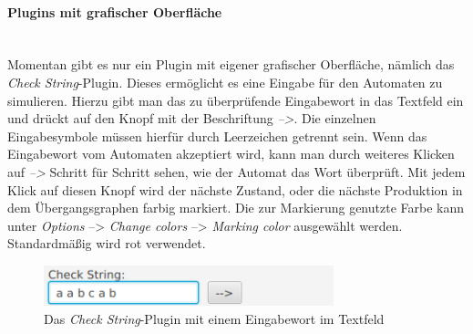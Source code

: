 \paragraph{Plugins mit grafischer Oberfläche}\ \\
\label{sec:2.4.2.1}
Momentan gibt es nur ein Plugin mit eigener grafischer Oberfläche, nämlich das \textit{Check String}-Plugin. Dieses ermöglicht es eine Eingabe für den Automaten zu simulieren. Hierzu gibt man das zu überprüfende Eingabewort in das Textfeld ein und drückt auf den Knopf mit der Beschriftung \textit{-->}. Die einzelnen Eingabesymbole müssen hierfür durch Leerzeichen getrennt sein. Wenn das Eingabewort vom Automaten akzeptiert wird, kann man durch weiteres Klicken auf \textit{-->} Schritt für Schritt sehen, wie der Automat das Wort überprüft. Mit jedem Klick auf diesen Knopf wird der nächste Zustand, oder die nächste Produktion in dem Übergangsgraphen farbig markiert. Die zur Markierung genutzte Farbe kann unter \textit{Options} --> \textit{Change colors} --> \textit{Marking color} ausgewählt werden. Standardmäßig wird rot verwendet.
\begin{figure}[H]
	\centering
	\includegraphics[width=0.75\textwidth]{bilder/gui3.png}
	\caption{Das \textit{Check String}-Plugin mit einem Eingabewort im Textfeld}
	\label{fig:pic6}
\end{figure}

